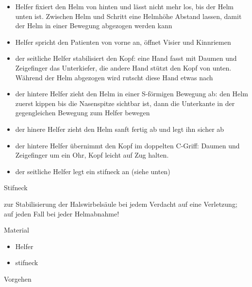 \documentclass{article}
\begin{document}
\begin{itemize}
\item { Helfer fixiert den Helm von hinten und l\"asst nicht mehr los, bis der
Helm unten ist. Zwischen Helm und Schritt eine Helmh\"ohe Abstand
lassen, damit der Helm in einer Bewegung abgezogen werden kann}

\item { Helfer spricht den Patienten von vorne an, \"offnet Visier und
Kinnriemen}

\item {\mdseries
der seitliche Helfer stabilisiert den Kopf: eine Hand fasst mit Daumen
und Zeigefinger das Unterkiefer, die andere Hand st\"utzt den Kopf von
unten. W\"ahrend der Helm abgezogen wird rutscht diese Hand etwas nach}

\item {\mdseries
der hintere Helfer zieht den Helm in einer S-f\"ormigen Bewegung ab: den
Helm zuerst kippen bis die Nasenspitze sichtbar ist, dann die
Unterkante in der gegengleichen Bewegung zum Helfer bewegen}

\item {\mdseries
der hinere Helfer zieht den Helm sanft fertig ab und legt ihn sicher ab}

\item {\mdseries
der hintere Helfer \"ubernimmt den Kopf im doppelten C-Griff: Daumen und
Zeigefinger um ein Ohr, Kopf leicht auf Zug halten.}

\item {\mdseries
der seitliche Helfer legt ein stifneck an (siehe unten)}

\end{itemize}
{\mdseries\color[rgb]{0.0,0.0,0.5019608}
Stifneck}

{\mdseries
zur Stabilisierung der Halswirbels\"aule bei jedem Verdacht auf eine
Verletzung; auf jeden Fall bei jeder Helmabnahme!}

{\mdseries\color{black}
Material}

\begin{itemize}
\item { Helfer}

\item { stifneck}

\end{itemize}
{\mdseries\color{black}
Vorgehen}
\end{document}
